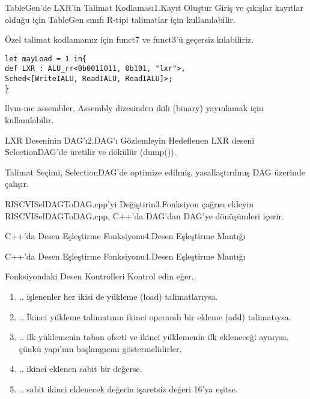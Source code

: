 \begin{frame}[fragile]{TableGen'de LXR'in Talimat Kodlaması}{1.Kayıt Oluştur}
Giriş ve çıkışlar kayıtlar olduğu için TableGen sınıfı R-tipi talimatlar için kullanılabilir.

Özel talimat kodlamamız için funct7 ve funct3'ü geçersiz kılabiliriz.
\begin{lstlisting}
let mayLoad = 1 in{
def LXR : ALU_rr<0b0011011, 0b101, "lxr">,
Sched<[WriteIALU, ReadIALU, ReadIALU]>;
}
\end{lstlisting}
llvm-mc assembler, Assembly dizesinden ikili (binary) yayınlamak için kullanılabilir.
\end{frame}

\begin{frame}[fragile]{LXR Deseninin DAG'ı}{2.DAG'ı Gözlemleyin}
Hedeflenen LXR deseni SelectionDAG'de üretilir ve dökülür (dump()).

Talimat Seçimi, SelectionDAG'de optimize edilmiş, yasallaştırılmış DAG üzerinde çalışır.
\end{frame}

\begin{frame}[fragile]{RISCVISelDAGToDAG.cpp'yi Değiştirin}{3.Fonksiyon çağrısı ekleyin}
    RISCVISelDAGToDAG.cpp, C++'da DAG'dan DAG'ye dönüşümleri içerir.

\end{frame}


\begin{frame}[fragile]{C++'da Desen Eşleştirme Fonksiyonu}{4.Desen Eşleştirme Mantığı}

\end{frame}

\begin{frame}[fragile]{C++'da Desen Eşleştirme Fonksiyonu}{4.Desen Eşleştirme Mantığı}

\end{frame}

\begin{frame}{Fonksiyondaki Desen Kontrolleri}
Kontrol edin eğer..
\begin{enumerate}
    \item .. işlenenler her ikisi de yükleme (load) talimatlarıysa.
    \item .. İkinci yükleme talimatının ikinci operandı bir ekleme (add) talimatıysa.
    \item .. ilk yüklemenin taban ofseti ve ikinci yüklemenin ilk ekleneceği aynıysa, çünkü yapı'nın başlangıcını göstermelidirler.
    \item .. ikinci eklenen sabit bir değerse.
    \item .. sabit ikinci eklenecek değerin işaretsiz değeri 16'ya eşitse.
\end{enumerate}
\end{frame}


